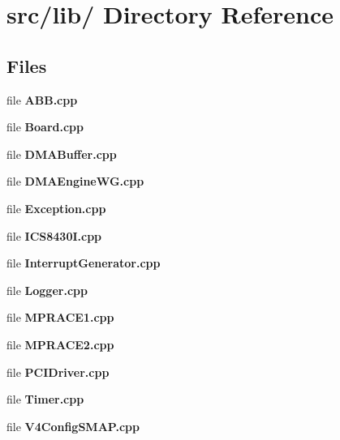 \hypertarget{dir_000003}{
\section{src/lib/ Directory Reference}
\label{dir_000003}
}
\subsection*{Files}
\begin{CompactItemize}
\item 
file {\bf ABB.cpp}
\item 
file {\bf Board.cpp}
\item 
file {\bf DMABuffer.cpp}
\item 
file {\bf DMAEngineWG.cpp}
\item 
file {\bf Exception.cpp}
\item 
file {\bf ICS8430I.cpp}
\item 
file {\bf InterruptGenerator.cpp}
\item 
file {\bf Logger.cpp}
\item 
file {\bf MPRACE1.cpp}
\item 
file {\bf MPRACE2.cpp}
\item 
file {\bf PCIDriver.cpp}
\item 
file {\bf Timer.cpp}
\item 
file {\bf V4ConfigSMAP.cpp}
\end{CompactItemize}

